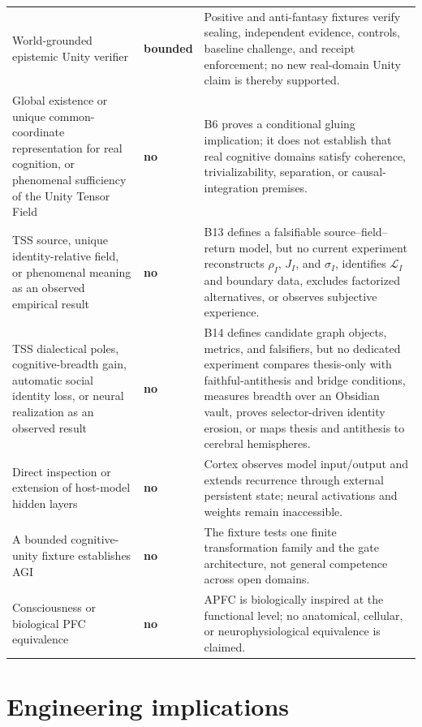 \documentclass[10pt,twocolumn]{article}
\theoremstyle{definition}
\theoremstyle{plain}
\theoremstyle{remark}
\newcommand{\unsupported}{\textcolor{APFCRed!85!black}{\textbf{no}}}
\newcommand{\bounded}{\textcolor{SafetyOrange!90!black}{\textbf{bounded}}}
\begin{document}
\begin{table}[!t]
\begin{tabularx}{\textwidth}{@{}p{}p{}X@{}}
World-grounded epistemic Unity verifier & \bounded & Positive and anti-fantasy fixtures verify sealing, independent evidence, controls, baseline challenge, and receipt enforcement; no new real-domain Unity claim is thereby supported. \\
Global existence or unique common-coordinate representation for real cognition, or phenomenal sufficiency of the Unity Tensor Field & \unsupported & B6 proves a conditional gluing implication; it does not establish that real cognitive domains satisfy coherence, trivializability, separation, or causal-integration premises. \\
TSS source, unique identity-relative field, or phenomenal meaning as an observed empirical result & \unsupported & B13 defines a falsifiable source--field--return model, but no current experiment reconstructs $\rho_I$, $J_I$, and $\sigma_I$, identifies $\mathcal L_I$ and boundary data, excludes factorized alternatives, or observes subjective experience. \\
TSS dialectical poles, cognitive-breadth gain, automatic social identity loss, or neural realization as an observed result & \unsupported & B14 defines candidate graph objects, metrics, and falsifiers, but no dedicated experiment compares thesis-only with faithful-antithesis and bridge conditions, measures breadth over an Obsidian vault, proves selector-driven identity erosion, or maps thesis and antithesis to cerebral hemispheres. \\
Direct inspection or extension of host-model hidden layers & \unsupported & Cortex observes model input/output and extends recurrence through external persistent state; neural activations and weights remain inaccessible. \\
A bounded cognitive-unity fixture establishes AGI & \unsupported & The fixture tests one finite transformation family and the gate architecture, not general competence across open domains. \\
Consciousness or biological PFC equivalence & \unsupported & APFC is biologically inspired at the functional level; no anatomical, cellular, or neurophysiological equivalence is claimed. \\
\bottomrule
\end{tabularx}
\end{table}

\section{Engineering implications}
\end{document}
